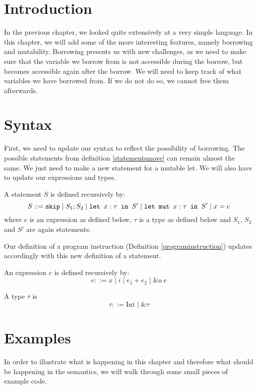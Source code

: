 \section{Introduction}
In the previous chapter, we looked quite extensively at a very simple language. In this chapter, we will add some of the more interesting features, namely borrowing and mutability. Borrowing presents us with new challenges, as we need to make sure that the variable we borrow from is not accessible during the borrow, but becomes accessible again after the borrow. We will need to keep track of what variables we have borrowed from. If we do not do so, we cannot free them afterwards. 

\section{Syntax}
\label{syntaxborrow}
First, we need to update our syntax to reflect the possibility of borrowing. The possible statements from definition \ref{statementsmove} can remain almost the same. We just need to make a new statement for a mutable let. We will also have to update our expressions and types. 

\begin{definition}
\label{statementsborrow}
A statement $S$ is defined recursively by:
$$S ::= \texttt{skip} \mid S_1; S_2 \mid \texttt{let }x : \tau \texttt{ in } S' \mid \texttt{let mut }x : \tau \texttt{ in } S' \mid x = e $$
where $e$ is an expression as defined below, $\tau$ is a type as defined below and $S_1$, $S_2$ and $S'$ are again statements.
\end{definition}

Our definition of a program instruction (Definition \ref{programinstruction}) updates accordingly with this new definition of a statement. 

\begin{definition}
\label{expressionsborrow}
An expression $e$ is defined recursively by:
$$e ::= x \mid i \mid e_1 + e_2 \mid \&a~e$$
\end{definition}

\begin{definition}
\label{typesborrow}
A type $\tau$ is
$$\tau ::= \textrm{Int} \mid \& \tau$$
\end{definition}

\section{Examples}

In order to illustrate what is happening in this chapter and therefore what should be happening in the semantics, we will walk through some small pieces of example code. 

